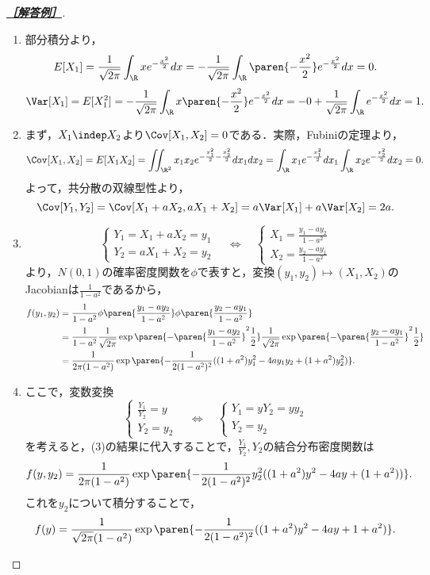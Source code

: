 \documentclass[uplatex,dvipdfmx]{jsarticle}
\begin{document}
\begin{proof}[\textbf{\underline{［解答例］}}]\mbox{}
    \begin{enumerate}
        \item 部分積分より，
        \[E[X_1]=\frac{1}{\sqrt{2\pi}}\int_\R xe^{-\frac{x^2}{2}}dx=-\frac{1}{\sqrt{2\pi}}\int_\R\paren{-\frac{x^2}{2}}e^{-\frac{x^2}{2}}dx=0.\]
        \[\Var[X_1]=E[X_1^2]=-\frac{1}{\sqrt{2\pi}}\int_\R x\paren{-\frac{x^2}{2}}e^{-\frac{x^2}{2}}dx=-0+\frac{1}{\sqrt{2\pi}}\int_\R e^{-\frac{x^2}{2}}dx=1.\]
        \item まず，$X_1\indep X_2$より$\Cov[X_1,X_2]=0$である．実際，Fubiniの定理より，
        \[\Cov[X_1,X_2]=E[X_1X_2]=\iint_{\R^2}x_1x_2e^{-\frac{x_1^2}{2}-\frac{x_2^2}{2}}dx_1dx_2=\int_{\R}x_1e^{-\frac{x_1^2}{2}}dx_1\int_\R x_2e^{-\frac{x_2^2}{2}}dx_2=0.\]
        よって，共分散の双線型性より，
        \[\Cov[Y_1,Y_2]=\Cov[X_1+aX_2,aX_1+X_2]=a\Var[X_1]+a\Var[X_2]=2a.\]
        \item \[\begin{cases}
            Y_1=X_1+aX_2=y_1\\
            Y_2=aX_1+X_2=y_2
        \end{cases}\quad\Leftrightarrow\quad\begin{cases}
            X_1=\frac{y_1-ay_2}{1-a^2}\\
            X_2=\frac{y_2-ay_1}{1-a^2}
        \end{cases}\]
        より，$N(0,1)$の確率密度関数を$\phi$で表すと，変換$(y_1,y_2)\mapsto(X_1,X_2)$のJacobianは$\frac{1}{1-a^2}$であるから，
        \begin{align*}
            f(y_1,y_2)&=\frac{1}{1-a^2}\phi\paren{\frac{y_1-ay_2}{1-a^2}}\phi\paren{\frac{y_2-ay_1}{1-a^2}}\\
            &=\frac{1}{1-a^2}\frac{1}{\sqrt{2\pi}}\exp\paren{-\paren{\frac{y_1-ay_2}{1-a^2}}^2\frac{1}{2}}\frac{1}{\sqrt{2\pi}}\exp\paren{-\paren{\frac{y_2-ay_1}{1-a^2}}^2\frac{1}{2}}\\
            &=\frac{1}{2\pi(1-a^2)}\exp\paren{-\frac{1}{2(1-a^2)^2}((1+a^2)y_1^2-4ay_1y_2+(1+a^2)y_2^2)}.
        \end{align*}
        \item ここで，変数変換
        \[\begin{cases}
            \frac{Y_1}{Y_2}=y\\
            Y_2=y_2
        \end{cases}\quad\Leftrightarrow\quad\begin{cases}
            Y_1=yY_2=yy_2\\
            Y_2=y_2
        \end{cases}\]
        を考えると，(3)の結果に代入することで，$\frac{Y_1}{Y_2},Y_2$の結合分布密度関数は
        \[f(y,y_2)=\frac{1}{2\pi(1-a^2)}\exp\paren{-\frac{1}{2(1-a^2)^2}y^2_2((1+a^2)y^2-4ay+(1+a^2))}.\]
        これを$y_2$について積分することで，
        \[f(y)=\frac{1}{\sqrt{2\pi}(1-a^2)}\exp\paren{-\frac{1}{2(1-a^2)^2}((1+a^2)y^2-4ay+1+a^2)}.\]
    \end{enumerate}
\end{proof}
\end{document}

